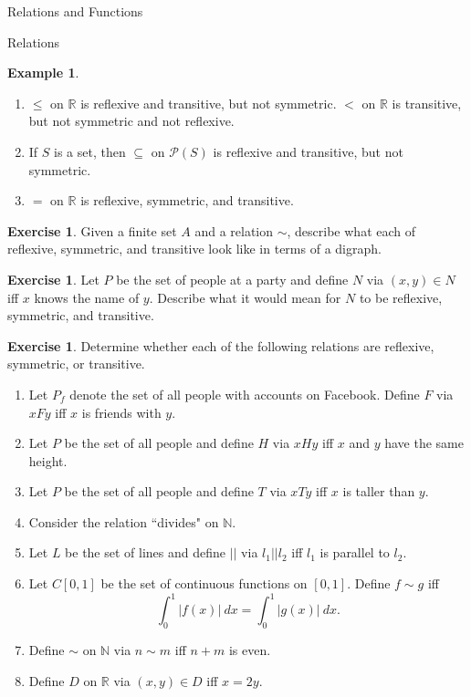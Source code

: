 \documentclass[11pt]{article}
\theoremstyle{definition}
\newtheorem{example}[theorem]{Example}
\newtheorem{exercise}[theorem]{Exercise}
\begin{document}
\begin{section}{Relations and Functions}
\begin{subsection}{Relations}
\begin{example}\
\begin{enumerate}
\item $\leq$ on $\mathbb{R}$ is reflexive and transitive, but not symmetric.
$<$ on $\mathbb{R}$ is transitive, but not symmetric and not reflexive.
\item If $S$ is a set, then $\subseteq$ on $\mathcal{P}(S)$ is reflexive and transitive, but not symmetric.
\item $=$ on $\mathbb{R}$ is reflexive, symmetric, and transitive.
\end{enumerate}

\end{example}

\begin{exercise}
Given a finite set $A$ and a relation $\sim$, describe what each of reflexive, symmetric, and transitive look like in terms of a digraph.
\end{exercise}

\begin{exercise}
Let $P$ be the set of people at a party and define $N$ via $(x,y)\in N$ iff $x$ knows the name of $y$.  Describe what it would mean for $N$ to be reflexive, symmetric, and transitive.
\end{exercise}

\begin{exercise}
Determine whether each of the following relations are reflexive, symmetric, or transitive.

\begin{enumerate}
\item Let $P_f$ denote the set of all people with accounts on Facebook.  Define  $F$ via $xFy$ iff $x$ is friends with $y$. 
\item Let $P$ be the set of all people and define $H$ via $xHy$ iff $x$ and $y$ have the same height.
\item Let $P$ be the set of all people and define $T$ via $xTy$ iff $x$ is taller than $y$.
\item Consider the relation ``divides" on $\mathbb{N}$.
\item Let $L$ be the set of lines and define $||$ via $l_1||l_2$ iff $l_1$ is parallel to $l_2$.
\item Let $C[0,1]$ be the set of continuous functions on $[0,1]$.  Define $f\sim g$ iff
\[
\int_0^1|f(x)|\ dx=\int_0^1|g(x)|\ dx.
\]
\item Define $\sim$ on $\mathbb{N}$ via $n\sim m$ iff $n+m$ is even.
\item Define $D$ on $\mathbb{R}$ via $(x,y)\in D$ iff $x=2y$.
\end{enumerate}
\end{exercise}

\end{subsection}

\end{section}
\end{document}
